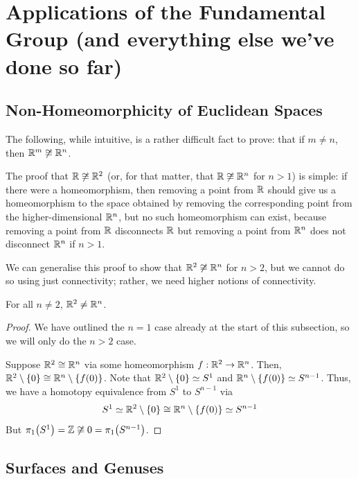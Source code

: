 \section{Applications of the Fundamental Group (and everything else we've done so far)}

\subsection{Non-Homeomorphicity of Euclidean Spaces}

The following, while intuitive, is a rather difficult fact to prove: that if $m \neq n$, then $\mathbb{R}^m \not\cong \mathbb{R}^n$.

The proof that $\mathbb{R} \not\cong \mathbb{R}^2$ (or, for that matter, that $\mathbb{R} \not\cong \mathbb{R}^n$ for $n > 1$) is simple: if there were a homeomorphism, then removing a point from $\mathbb{R}$ should give us a homeomorphism to the space obtained by removing the corresponding point from the higher-dimensional $\mathbb{R}^n$, but no such homeomorphism can exist, because removing a point from $\mathbb{R}$ disconnects $\mathbb{R}$ but removing a point from $\mathbb{R}^n$ does not disconnect $\mathbb{R}^n$ if $n > 1$.

We can generalise this proof to show that $\mathbb{R}^2 \not\cong \mathbb{R}^n$ for $n > 2$, but we cannot do so using just connectivity; rather, we need higher notions of connectivity.

\begin{boxtheorem}
    For all $n \neq 2$, $\mathbb{R}^2 \neq \mathbb{R}^n$.
\end{boxtheorem}
\begin{proof}
    We have outlined the $n = 1$ case already at the start of this subsection, so we will only do the $n > 2$ case.

    Suppose $\mathbb{R}^2 \cong \mathbb{R}^n$ via some homeomorphism $f : \mathbb{R}^2 \to \mathbb{R}^n$. Then, $\mathbb{R}^2 \setminus \left\{ 0 \right\} \cong \mathbb{R}^n \setminus \left\{ f(0) \right\}$. Note that $\mathbb{R}^2 \setminus \left\{ 0 \right\} \simeq S^1$ and $\mathbb{R}^n \setminus \left\{ f(0) \right\} \simeq S^{n - 1}$. Thus, we have a homotopy equivalence from $S^1$ to $S^{n - 1}$ via
    \begin{align*}
        S^1 \simeq \mathbb{R}^2 \setminus \left\{ 0 \right\} \cong \mathbb{R}^n \setminus \left\{ f(0) \right\} \simeq S^{n-1}
    \end{align*}
    But $\pi_1\!\left( S^1 \right) = \mathbb{Z} \not\cong 0 = \pi_1\!\left( S^{n-1} \right)$.
\end{proof}

\subsection{Surfaces and Genuses}


